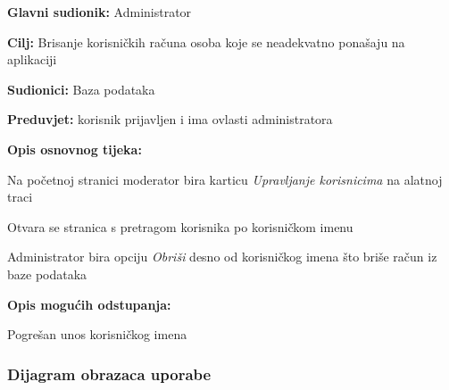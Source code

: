 					\noindent {}
					\begin{packed_item}
						
						\item \textbf{Glavni sudionik: }Administrator
						\item  \textbf{Cilj:} Brisanje korisničkih računa osoba koje se neadekvatno ponašaju na aplikaciji
						\item  \textbf{Sudionici:}
						Baza podataka
						\item  \textbf{Preduvjet:} korisnik prijavljen i ima ovlasti administratora
						\item  \textbf{Opis osnovnog tijeka:}
						
						\item[] \begin{packed_enum}
							
							\item	Na početnoj stranici moderator bira karticu \textit{Upravljanje korisnicima} na alatnoj traci
							\item	Otvara se stranica s pretragom korisnika po korisničkom imenu
							\item	Administrator bira opciju \textit{Obriši} desno od korisničkog imena što briše račun iz baze podataka
							
						\end{packed_enum}
						
						\item  \textbf{Opis mogućih odstupanja:}
						
						\item[] \begin{packed_item}
							
							\item[2.a] Pogrešan unos korisničkog imena
							
						\end{packed_item}
					\end{packed_item}
				\eject
					
				\subsubsection{Dijagram obrazaca uporabe} 
				
